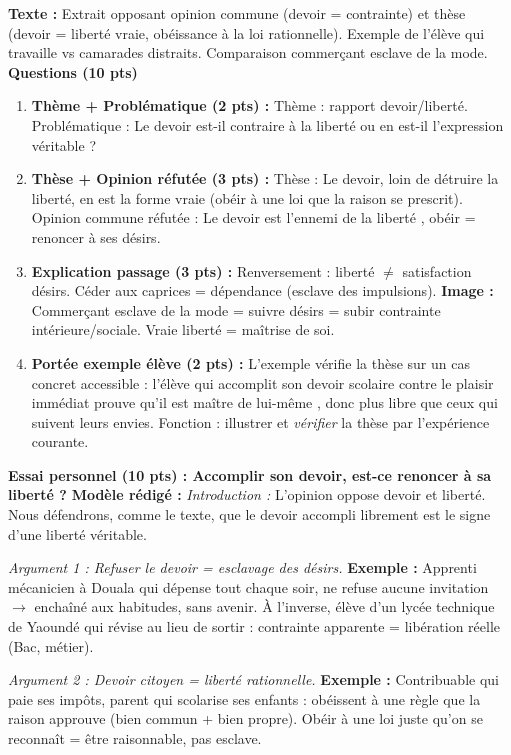 \documentclass[11pt]{article}
\begin{document}
\begin{exoresolu}
\textbf{Texte :} Extrait opposant opinion commune (devoir = contrainte) et thèse (devoir = liberté vraie, obéissance à la loi rationnelle). Exemple de l'élève qui travaille vs camarades distraits. Comparaison commerçant esclave de la mode.
\tcblower
\textbf{Questions (10 pts)}
\begin{enumerate}
\item \textbf{Thème + Problématique (2 pts) :} Thème : rapport devoir/liberté. Problématique : Le devoir est-il contraire à la liberté ou en est-il l'expression véritable ?
\item \textbf{Thèse + Opinion réfutée (3 pts) :} Thèse : Le devoir, loin de détruire la liberté, en est la forme vraie (obéir à une loi que la raison se prescrit). Opinion commune réfutée : \og Le devoir est l'ennemi de la liberté \fg, obéir = renoncer à ses désirs.
\item \textbf{Explication passage (3 pts) :} Renversement : liberté $\neq$ satisfaction désirs. Céder aux caprices = dépendance (esclave des impulsions). \textbf{Image :} \og Commerçant esclave de la mode \fg = suivre désirs = subir contrainte intérieure/sociale. Vraie liberté = maîtrise de soi.
\item \textbf{Portée exemple élève (2 pts) :} L'exemple vérifie la thèse sur un cas concret accessible : l'élève qui accomplit son devoir scolaire contre le plaisir immédiat prouve qu'il est \og maître de lui-même \fg, donc plus libre que ceux qui suivent leurs envies. Fonction : illustrer et \emph{vérifier} la thèse par l'expérience courante.
\end{enumerate}

\textbf{Essai personnel (10 pts) : \og Accomplir son devoir, est-ce renoncer à sa liberté ? \fg}
\textbf{Modèle rédigé :}
\textit{Introduction :} L'opinion oppose devoir et liberté. Nous défendrons, comme le texte, que le devoir accompli librement est le signe d'une liberté véritable.

\textit{Argument 1 : Refuser le devoir = esclavage des désirs.} \textbf{Exemple :} Apprenti mécanicien à Douala qui dépense tout chaque soir, ne refuse aucune invitation $\rightarrow$ enchaîné aux habitudes, sans avenir. À l'inverse, élève d'un lycée technique de Yaoundé qui révise au lieu de sortir : contrainte apparente = libération réelle (Bac, métier).

\textit{Argument 2 : Devoir citoyen = liberté rationnelle.} \textbf{Exemple :} Contribuable qui paie ses impôts, parent qui scolarise ses enfants : obéissent à une règle que la raison approuve (bien commun + bien propre). Obéir à une loi juste qu'on se reconnaît = être raisonnable, pas esclave.


\end{exoresolu}
\end{document}
